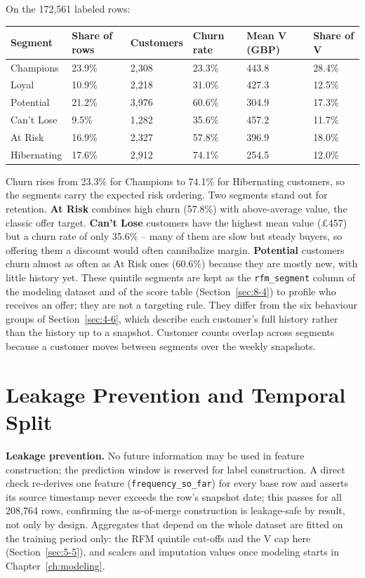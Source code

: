 On the 172,561 labeled rows:

\begin{center}
\begin{tabular}{@{}p{2.6cm}p{1.8cm}p{1.8cm}p{1.8cm}p{2.2cm}p{2.2cm}@{}}
    \toprule
    Segment & Share of rows & Customers & Churn rate & Mean V (GBP) & Share of V \\
    \midrule
    Champions & 23.9\% & 2,308 & 23.3\% & 443.8 & 28.4\% \\
    Loyal & 10.9\% & 2,218 & 31.0\% & 427.3 & 12.5\% \\
    Potential & 21.2\% & 3,976 & 60.6\% & 304.9 & 17.3\% \\
    Can't Lose & 9.5\% & 1,282 & 35.6\% & 457.2 & 11.7\% \\
    At Risk & 16.9\% & 2,327 & 57.8\% & 396.9 & 18.0\% \\
    Hibernating & 17.6\% & 2,912 & 74.1\% & 254.5 & 12.0\% \\
    \bottomrule
\end{tabular}
\end{center}

Churn rises from 23.3\% for Champions to 74.1\% for Hibernating customers, so the segments carry the expected risk ordering. Two segments stand out for retention. \textbf{At Risk} combines high churn (57.8\%) with above-average value, the classic offer target. \textbf{Can't Lose} customers have the highest mean value (\pounds457) but a churn rate of only 35.6\% -- many of them are slow but steady buyers, so offering them a discount would often cannibalize margin. \textbf{Potential} customers churn almost as often as At Risk ones (60.6\%) because they are mostly new, with little history yet. These quintile segments are kept as the \texttt{rfm\_segment} column of the modeling dataset and of the score table (Section~\ref{sec:8-4}) to profile who receives an offer; they are not a targeting rule. They differ from the six behaviour groups of Section~\ref{sec:4-6}, which describe each customer's full history rather than the history up to a snapshot. Customer counts overlap across segments because a customer moves between segments over the weekly snapshots.

\section{Leakage Prevention and Temporal Split}
\label{sec:5-6}

\textbf{Leakage prevention.} No future information may be used in feature construction; the prediction window is reserved for label construction. A direct check re-derives one feature (\texttt{frequency\_so\_far}) for every base row and asserts its source timestamp never exceeds the row's snapshot date; this passes for all 208,764 rows, confirming the as-of-merge construction is leakage-safe by result, not only by design. Aggregates that depend on the whole dataset are fitted on the training period only: the RFM quintile cut-offs and the V cap here (Section~\ref{sec:5-5}), and scalers and imputation values once modeling starts in Chapter~\ref{ch:modeling}.

